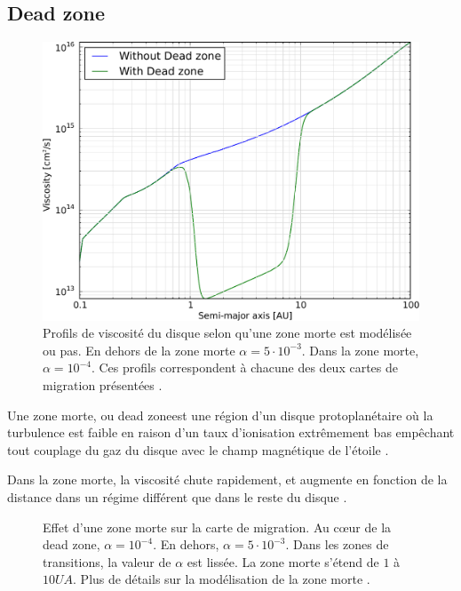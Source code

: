 \subsection{Dead zone}
\begin{figure}[htbp]
\centering
\includegraphics[width=0.6\linewidth]{figure/migration_map/viscosity/dead_zone_profile.pdf}
\caption{Profils de viscosité du disque selon qu'une zone morte est modélisée ou pas. En dehors de la zone morte $\alpha=5\cdot 10^{-3}$. Dans la zone morte, $\alpha=10^{-4}$. Ces profils correspondent à chacune des deux cartes de migration
présentées \protect{}. }\label{fig:dead_zone_profile}
\end{figure}

Une zone morte, ou \og dead zone\fg est une région d'un disque protoplanétaire où la turbulence est faible en raison d'un taux
d'ionisation extrêmement bas empêchant tout couplage du gaz du disque avec le champ magnétique de l'étoile
.

Dans la zone morte, la viscosité chute rapidement, et augmente en fonction de la distance dans un régime différent que dans le reste du disque . 

\begin{figure}[htbp]
\centering
{}\hfill
{}

\caption{Effet d'une zone morte sur la carte de migration. Au cœur de la dead zone, $\alpha=10^{-4}$. En dehors, $\alpha=5\cdot 10^{-3}$. Dans les zones de transitions, la valeur de $\alpha$ est lissée. La zone morte s'étend de $1$ à $10\unit{UA}$. Plus de détails sur la modélisation de la zone morte \protect{}. }\label{fig:viscosity_DZ}
\end{figure}

